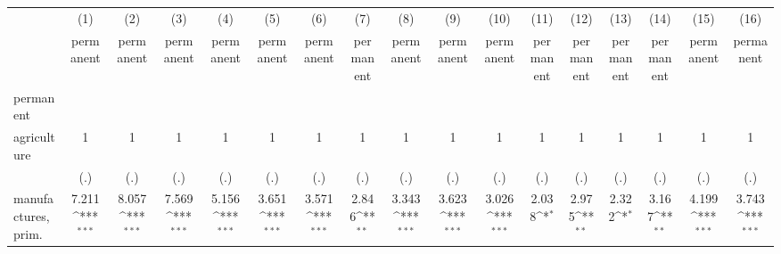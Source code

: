 {
\def\sym#1{\ifmmode^{#1}\else\(^{#1}\)\fi}
\begin{tabular}{l*{16}{c}}
\hline\hline
                    &\multicolumn{1}{c}{(1)}&\multicolumn{1}{c}{(2)}&\multicolumn{1}{c}{(3)}&\multicolumn{1}{c}{(4)}&\multicolumn{1}{c}{(5)}&\multicolumn{1}{c}{(6)}&\multicolumn{1}{c}{(7)}&\multicolumn{1}{c}{(8)}&\multicolumn{1}{c}{(9)}&\multicolumn{1}{c}{(10)}&\multicolumn{1}{c}{(11)}&\multicolumn{1}{c}{(12)}&\multicolumn{1}{c}{(13)}&\multicolumn{1}{c}{(14)}&\multicolumn{1}{c}{(15)}&\multicolumn{1}{c}{(16)}\\
                    &\multicolumn{1}{c}{permanent}&\multicolumn{1}{c}{permanent}&\multicolumn{1}{c}{permanent}&\multicolumn{1}{c}{permanent}&\multicolumn{1}{c}{permanent}&\multicolumn{1}{c}{permanent}&\multicolumn{1}{c}{permanent}&\multicolumn{1}{c}{permanent}&\multicolumn{1}{c}{permanent}&\multicolumn{1}{c}{permanent}&\multicolumn{1}{c}{permanent}&\multicolumn{1}{c}{permanent}&\multicolumn{1}{c}{permanent}&\multicolumn{1}{c}{permanent}&\multicolumn{1}{c}{permanent}&\multicolumn{1}{c}{permanent}\\
\hline
permanent           &                     &                     &                     &                     &                     &                     &                     &                     &                     &                     &                     &                     &                     &                     &                     &                     \\
agriculture         &           1         &           1         &           1         &           1         &           1         &           1         &           1         &           1         &           1         &           1         &           1         &           1         &           1         &           1         &           1         &           1         \\
                    &         (.)         &         (.)         &         (.)         &         (.)         &         (.)         &         (.)         &         (.)         &         (.)         &         (.)         &         (.)         &         (.)         &         (.)         &         (.)         &         (.)         &         (.)         &         (.)         \\
[1em]
manufactures, prim. &       7.211\sym{***}&       8.057\sym{***}&       7.569\sym{***}&       5.156\sym{***}&       3.651\sym{***}&       3.571\sym{***}&       2.846\sym{**} &       3.343\sym{***}&       3.623\sym{***}&       3.026\sym{***}&       2.038\sym{*}  &       2.975\sym{**} &       2.322\sym{*}  &       3.167\sym{**} &       4.199\sym{***}&       3.743\sym{***}\\

\end{tabular}}

